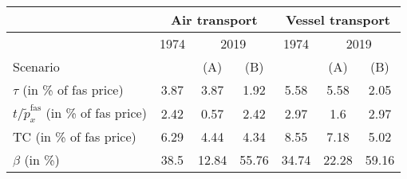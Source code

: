\begin{tabular}{l|c|cc||c|cc}
\hline \hline
& \multicolumn{3}{|c||}{Air transport} & \multicolumn{3}{|c}{Vessel transport} \\ \hline
& 1974 & \multicolumn{2}{|c||}{2019} & 1974 & \multicolumn{2}{|c}{2019}\\ \cline{2-7}
Scenario &  & (A) &  (B) &  & (A) & (B) \\ \hline
$\tau$ (in \% of fas price) & 3.87 & 3.87 & 1.92 & 5.58 & 5.58 & 2.05\\
$t/\widetilde{p}^{\text{fas}}_x$ (in \% of fas price) & 2.42 & 0.57 & 2.42 & 2.97 & 1.6 & 2.97 \\
TC (in \% of fas price) & 6.29 & 4.44 & 4.34 & 8.55 & 7.18 & 5.02 \\
$\beta$ (in \%) & 38.5 & 12.84 & 55.76 & 34.74 & 22.28 &59.16 \\
\hline \hline
\end{tabular} 